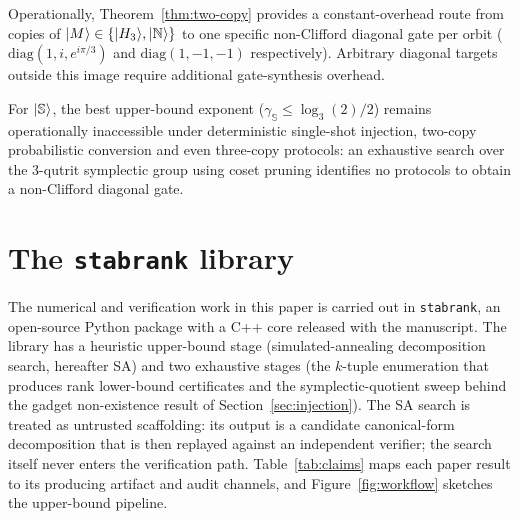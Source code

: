 \documentclass[11pt]{article}
\theoremstyle{definition}
\newcommand{\microspace}{\mspace{0.5mu}}
\newcommand{\ket}[1]{\lvert\microspace #1 \microspace \rangle}
\newcommand{\Strange}{\ket{\mathbb{S}}}
\newcommand{\Hth}{\ket{H_3}}
\newcommand{\Norrell}{\ket{\mathbb{N}}}
\begin{document}
	Operationally, Theorem~\ref{thm:two-copy} provides a constant-overhead route from copies of $\ket M \in \{\Hth, \Norrell\}$ to one specific non-Clifford diagonal gate per orbit ($\mathrm{diag}(1, i, e^{i\pi/3})$ and $\mathrm{diag}(1, -1, -1)$ respectively). Arbitrary diagonal targets outside this image require additional gate-synthesis overhead. 
	
	For $\Strange$, the best upper-bound exponent ($\gamma_{\mathbb{S}} \le \log_3(2)/2$) remains operationally inaccessible under deterministic single-shot injection, two-copy probabilistic conversion and even three-copy protocols: an exhaustive search over the 3-qutrit symplectic group using coset pruning identifies no protocols to obtain a non-Clifford diagonal gate.
	
	\section{The \texttt{stabrank} library}\label{sec:stabrank}

	The numerical and verification work in this paper is carried out
	in \texttt{stabrank}, an open-source Python package with a C++
	core released with the manuscript. The library has a heuristic
	upper-bound stage (simulated-annealing decomposition search,
	hereafter SA) and two exhaustive stages (the $k$-tuple enumeration
	that produces rank lower-bound certificates and the
	symplectic-quotient sweep behind the gadget non-existence result of
	Section~\ref{sec:injection}). The SA search is treated as untrusted
	scaffolding: its output is a candidate canonical-form decomposition
	that is then replayed against an independent verifier; the search
	itself never enters the verification path.
	Table~\ref{tab:claims} maps each paper result to its producing
	artifact and audit channels, and Figure~\ref{fig:workflow}
	sketches the upper-bound pipeline.
	
\end{document}
